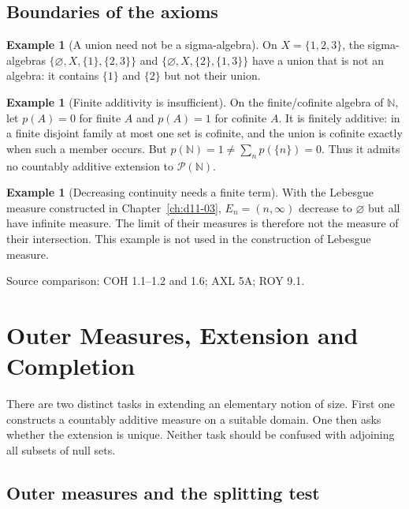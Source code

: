 \documentclass[11pt,oneside,openany]{book}
\theoremstyle{definition}
\newtheorem{example}[theorem]{Example}
\theoremstyle{remark}
\newcommand{\N}{\mathbb N}\newcommand{\Z}{\mathbb Z}\newcommand{\Q}{\mathbb Q}
\newcommand{\family}[1]{}
\newcommand{\source}[1]{\par\begingroup\small\sffamily\color{black!65}Source comparison: #1\par\endgroup}
\begin{document}
\section{Boundaries of the axioms}

\begin{example}[A union need not be a sigma-algebra]
\family{D11.01.union_sigma_failure}\label{d11:01:union-sigma-failure}
On $X=\{1,2,3\}$, the sigma-algebras
$\{\varnothing,X,\{1\},\{2,3\}\}$ and
$\{\varnothing,X,\{2\},\{1,3\}\}$ have a union that is not an algebra:
it contains $\{1\}$ and $\{2\}$ but not their union.
\end{example}

\begin{example}[Finite additivity is insufficient]
\family{D11.01.finite_additivity_failure}\label{d11:01:finite-additivity-failure}
On the finite/cofinite algebra of $\N$, let $p(A)=0$ for finite $A$ and
$p(A)=1$ for cofinite $A$. It is finitely additive: in a finite disjoint family
at most one set is cofinite, and the union is cofinite exactly when such a
member occurs. But $p(\N)=1\ne\sum_n p(\{n\})=0$. Thus it admits no
countably additive extension to $\mathcal P(\N)$.
\end{example}

\begin{example}[Decreasing continuity needs a finite term]
\family{D11.01.continuity_above_failure}\label{d11:01:continuity-above-failure}
With the Lebesgue measure constructed in Chapter~\ref{ch:d11-03},
$E_n=(n,\infty)$ decrease to $\varnothing$ but all have infinite measure.
The limit of their measures is therefore not the measure of their intersection.
This example is not used in the construction of Lebesgue measure.
\end{example}
\source{COH 1.1--1.2 and 1.6; AXL 5A; ROY 9.1.}



\chapter{Outer Measures, Extension and Completion}\label{ch:d11-02}

There are two distinct tasks in extending an elementary notion of size.
First one constructs a countably additive measure on a suitable domain.
One then asks whether the extension is unique. Neither task should be
confused with adjoining all subsets of null sets.

\section{Outer measures and the splitting test}
\end{document}
